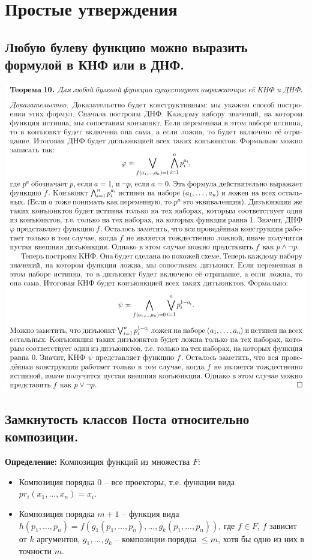 \section{Простые утверждения}

\subsection{Любую булеву функцию можно выразить формулой в КНФ или в ДНФ.}

\begin{center}
    \includegraphics[width=0.95\linewidth]{images/1_propositions_knf}
\end{center}

\subsection{Замкнутость классов Поста относительно композиции.}

\textbf{Определение:} Композиция функций из множества $F$:
\begin{itemize}
    \item Композиция порядка 0 -- все проекторы, т.е. функции вида $pr_i(x_1,\ldots,x_n)=x_i$.
    \item Композиция порядка $m+1$ -- функция вида $h(p_1,\ldots,p_n)=f(g_1(p_1,\ldots,p_n),\ldots,g_k(p_1,\ldots,p_n))$, где $f\in F$, $f$ зависит от $k$ аргументов, $g_1,\ldots,g_k$ -- композиции порядка $\leqslant m$, хотя бы одно из них в точности $m$.
\end{itemize}


